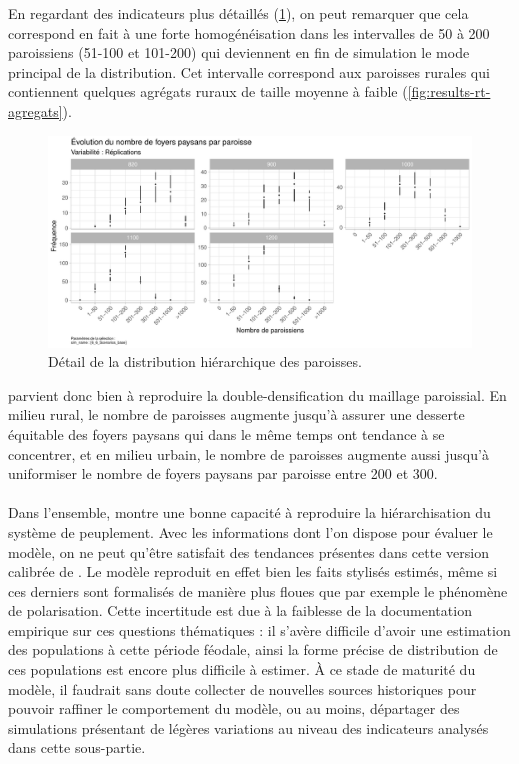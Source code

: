 En regardant des indicateurs plus détaillés (\cref{fig:results-paroisses-hierarchie}), on peut remarquer que cela correspond en fait à une forte homogénéisation dans les intervalles de 50 à 200 paroissiens (51-100 et 101-200) qui deviennent en fin de simulation le mode principal de la distribution.
Cet intervalle correspond aux paroisses rurales qui contiennent quelques agrégats ruraux de taille moyenne à faible (\cref{fig:results-rt-agregats}).

\begin{figure}[H]
	\centering
	\includegraphics[width=\linewidth]{img/results_6_6/Paroisses_Compo_Haut.pdf}
	\caption{Détail de la distribution hiérarchique des paroisses.}
	\label{fig:results-paroisses-hierarchie}
\end{figure}

\simfeodal{} parvient donc bien à reproduire la double-densification du maillage paroissial.
En milieu rural, le nombre de paroisses augmente jusqu'à assurer une desserte équitable des foyers paysans qui dans le même temps ont tendance à se concentrer, et en milieu urbain, le nombre de paroisses augmente aussi jusqu'à uniformiser le nombre de foyers paysans par paroisse entre 200 et 300.

\bigskip
\paragraph[Conclusion intermédiaire]{}
Dans l'ensemble, \simfeodal{} montre une bonne capacité à reproduire la hiérarchisation du système de peuplement.
Avec les informations dont l'on dispose pour évaluer le modèle, on ne peut qu'être satisfait des tendances présentes dans cette version calibrée de \simfeodal{}.
Le modèle reproduit en effet bien les faits stylisés estimés, même si ces derniers sont formalisés de manière plus floues que par exemple le phénomène de polarisation.
Cette incertitude est due à la faiblesse de la documentation empirique sur ces questions thématiques : il s'avère difficile d'avoir une estimation des populations à cette période féodale, ainsi la forme précise de distribution de ces populations est encore plus difficile à estimer.
À ce stade de maturité du modèle, il faudrait sans doute collecter de nouvelles sources historiques pour pouvoir raffiner le comportement du modèle, ou au moins, départager des simulations présentant de légères variations au niveau des indicateurs analysés dans cette sous-partie.

